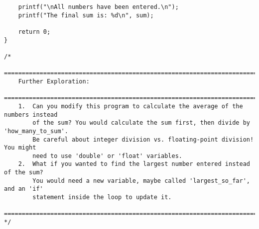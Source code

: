 \documentclass[11pt]{book}
\begin{document}
\begin{verbatim}
    printf("\nAll numbers have been entered.\n");
    printf("The final sum is: %d\n", sum);

    return 0;
}

/*
    ================================================================================
    Further Exploration:
    ================================================================================
    1.  Can you modify this program to calculate the average of the numbers instead
        of the sum? You would calculate the sum first, then divide by 'how_many_to_sum'.
        Be careful about integer division vs. floating-point division! You might
        need to use 'double' or 'float' variables.
    2.  What if you wanted to find the largest number entered instead of the sum?
        You would need a new variable, maybe called 'largest_so_far', and an 'if'
        statement inside the loop to update it.
    ================================================================================
*/

\end{verbatim}
\clearpage
\end{document}

